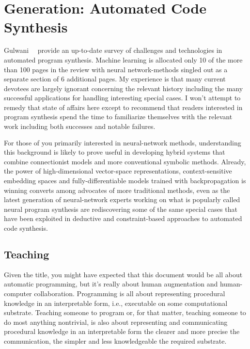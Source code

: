 
\section{Generation: Automated Code Synthesis}


Gulwani~\etal{}~\cite{GulwanietalFaTiPL-17} provide an up-to-date survey of challenges and technologies in automated program synthesis. Machine learning is allocated only 10 of the more than 100 pages in the review with neural network-methods singled out as a separate section of 6 additional pages. My experience is that many current devotees are largely ignorant concerning the relevant history including the many successful applications for handling interesting special cases. I won't attempt to remedy that state of affairs here except to recommend that readers interested in program synthesis spend the time to familiarize themselves with the relevant work including both successes and notable failures. 

For those of you primarily interested in neural-network methods, understanding this background is likely to prove useful in developing hybrid systems that combine connectionist models and more conventional symbolic methods. Already, the power of high-dimensional vector-space representations, context-sensitive embedding spaces and fully-differentiable models trained with backpropagation is winning converts among advocates of more traditional methods, even as the latest generation of neural-network experts working on what is popularly called neural program synthesis are rediscovering some of the same special cases that have been exploited in deductive and constraint-based approaches to automated code synthesis.


\subsection{Teaching}


Given the title, you might have expected that this document would be all about automatic programming, but it's really about human augmentation and human-computer collaboration. Programming is all about representing procedural knowledge in an interpretable form, i.e., executable on some computational substrate. Teaching someone to program or, for that matter, teaching someone to do most anything nontrivial, is also about representing and communicating procedural knowledge in an interpretable form \emdash{} the clearer and more precise the communication, the simpler and less knowledgeable the required substrate.

